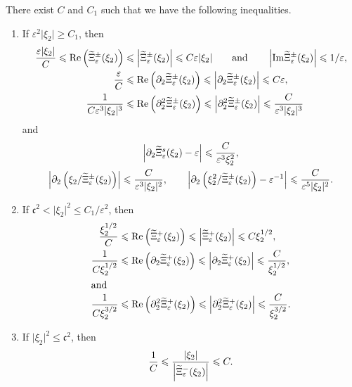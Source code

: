 \documentclass[10pt]{amsart}
\theoremstyle{definition}\newtheorem{defi}[theo]{Definition}\newtheorem{rema}[theo]{Remark}\newtheorem{exam}[theo]{Example}\newtheorem{exem}[theo]{Example}\newtheorem{nota}[theo]{Notation}
\newcommand*\p{\partial}
\newcommand{\Imm}{\mathrm{Im}}
\newcommand{\Rel}{\mathrm{Re}}
\newcommand*\cs{{\mathfrak c}}
\newcommand*\gs{\geqslant }
\newcommand*\ls{\leqslant }
\newcommand*\e{\varepsilon}
\renewcommand*\t{\tilde}
\newcommand*{\romanenumi}{\renewcommand*{\theenumi}{\roman{enumi}}}
\let\oldtilde\tilde
\renewcommand*{\tilde}[1]{\mathchoice{\widetilde{#1}}{\widetilde{#1}}{\oldtilde{#1}}{\oldtilde{#1}}}
\begin{document}
\begin{prop}\label{asym_Ztilde}
There exist $ C $ and $ C_1 $ such that we have the following inequalities.
\begin{enumerate}\romanenumi
\item\label{prop3.4.1} If $ \e^2 \lvert \xi_2 \rvert \gs C_1 $, then
\begin{align*}
\frac{\e | \xi_2|} {C } \ls \Rel \left(\t{\Xi}_\e^\pm (\xi_2) \right)
&\ls \left\lvert \t{\Xi}_\e^\pm (\xi_2) \right\rvert
\ls C \e | \xi_2|
\qquad \text{and} \qquad
\left\lvert {\Imm} \t{\Xi}_\e^\pm (\xi_2) \right\rvert \ls 1/\e,
\\
\frac{\e } {C } &\ls \Rel \left(\p_2 \t{\Xi}_\e^\pm (\xi_2) \right)
\ls \left\lvert \p_2 \t{\Xi}_\e^\pm (\xi_2) \right\rvert
\ls C \e,
\\
\frac{1 } {C \e^3 | \xi_2|^3 } &\ls \Rel \left(\p_2^2 \t{\Xi}_\e^\pm (\xi_2) \right)
\ls \left\lvert \p_2^2 \t{\Xi}_\e^\pm (\xi_2) \right\rvert
\ls \frac{C } { \e^3 | \xi_2|^3 }
\end{align*}
and
\begin{gather*}
\left\lvert \p_2 \t\Xi_\e^s (\xi_2) - \e \right\rvert
\ls \frac{ C}{ \e^3 \xi_2^2 },
\\
\left\lvert \p_2 \left(\xi_2 / \t{\Xi}_\e^\pm (\xi_2) \right) \right\rvert
\ls \frac{C } { \e^3 | \xi_2|^2 },
\qquad
\left\lvert \p_2 \left(\xi_2^2 / \t{\Xi}_\e^\pm (\xi_2) \right) - \e^{-1} \right\rvert
\ls \frac{C }{ \e^5 | \xi_2|^2 }.
\end{gather*}

\item\label{prop3.4.2} If $ \cs^2 < \lvert \xi_2 \rvert^2 \ls C_1 / \e^2 $, then
\begin{align*}
\frac{\xi_2^{1/2}}{C} &\ls \Rel \left(\t{\Xi}_\e^+ (\xi_2) \right)
\ls \left\lvert \t{\Xi}_\e^+ (\xi_2) \right\rvert \ls C \xi_2^{1/2},
\\
\frac{1}{C \xi_2^{1/2} } &\ls \Rel \left(\p_2 \t{\Xi}_\e^+ (\xi_2) \right)
\ls \left\lvert \p_2 \t{\Xi}_\e^+ (\xi_2) \right\rvert \ls \frac{C }{ \xi_2^{1/2} },
\\
\intertext{and}
\frac{1}{C \xi_2^{3/2} } &\ls \Rel \left(\p_2^2 \t{\Xi}_\e^+ (\xi_2) \right)
\ls \left\lvert \p_2^2 \t{\Xi}_\e^+ (\xi_2) \right\rvert \ls \frac{C }{ \xi_2^{3/2} }.
\end{align*}

\item\label{prop3.4.3} If $ \lvert \xi_2 \rvert^2 \ls \cs^2 $, then
\[
\frac{1}{C} \ls \frac{\lvert \xi_2 \rvert}{ \left\lvert \t\Xi_\e^- (\xi_2) \right\rvert } \ls C.
\]
\end{enumerate}
\end{prop}
\end{document}
